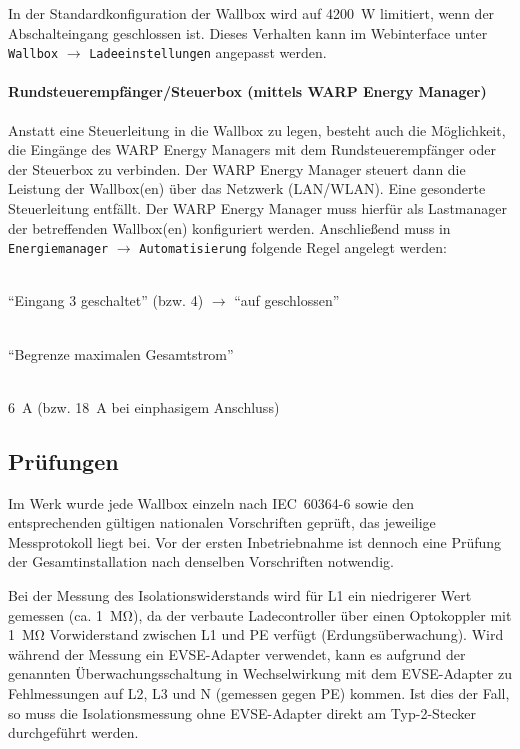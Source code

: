 \documentclass[a4paper,10pt]{article}
\begin{document}
\begin{multicols*}{2}
	In der Standardkonfiguration der Wallbox wird auf \SI{4200}{\watt} limitiert, wenn der Abschalteingang geschlossen ist. Dieses Verhalten kann im Webinterface unter \texttt{Wallbox} $\rightarrow$ \texttt{Ladeeinstellungen} angepasst werden.

    \paragraph*{Rundsteuerempfänger/Steuerbox (mittels WARP Energy Manager)}
    Anstatt eine Steuerleitung in die Wallbox zu legen, besteht auch die
    Möglichkeit, die Eingänge des WARP Energy Managers mit dem Rundsteuerempfänger oder der
    Steuerbox zu verbinden. Der WARP Energy Manager steuert dann die
    Leistung der Wallbox(en) über das Netzwerk (LAN/WLAN). Eine gesonderte
    Steuerleitung entfällt.
    Der WARP Energy Manager muss hierfür als Lastmanager der betreffenden Wallbox(en) konfiguriert werden.
    Anschließend muss in \texttt{Energiemanager} $\rightarrow$ \texttt{Automatisierung}
    folgende Regel angelegt werden:

    \begin{description}[labelindent=0.5cm, leftmargin=0.5cm]
        \item[Bedingung]\ \\ \enquote{Eingang 3 geschaltet} (bzw. 4) $\rightarrow$ \enquote{auf geschlossen}
        \item[Aktion]\ \\\enquote{Begrenze maximalen Gesamtstrom}
        \item[Maximaler Gesamtstrom]\ \\ \SI{6}{\ampere} (bzw. \SI{18}{\ampere} bei einphasigem Anschluss)
    \end{description}
    \vspace{-0.2cm}

    \subsection{Prüfungen}\label{tests}
    Im Werk wurde jede Wallbox einzeln nach IEC~60364-6 sowie den entsprechenden gültigen
    nationalen Vorschriften geprüft, das jeweilige Messprotokoll liegt bei.
    Vor der ersten Inbetriebnahme ist dennoch eine Prüfung der Gesamtinstallation
    nach denselben Vorschriften notwendig.

    Bei der Messung des Isolationswiderstands wird für L1 ein niedrigerer Wert
    gemessen (ca. \SI{1}{\mega\ohm}), da der verbaute Ladecontroller über einen Optokoppler mit
    \SI{1}{\mega\ohm} Vorwiderstand zwischen L1 und
    PE verfügt (Erdungsüberwachung). Wird während der Messung ein EVSE-Adapter verwendet,
    kann es aufgrund der genannten Überwachungsschaltung in Wechselwirkung mit dem EVSE-Adapter zu Fehlmessungen
    auf L2, L3 und N (gemessen gegen PE) kommen. Ist dies der Fall, so muss die Isolationsmessung
    ohne EVSE-Adapter direkt am Typ-2-Stecker durchgeführt werden.


\end{multicols*}
\end{document}
